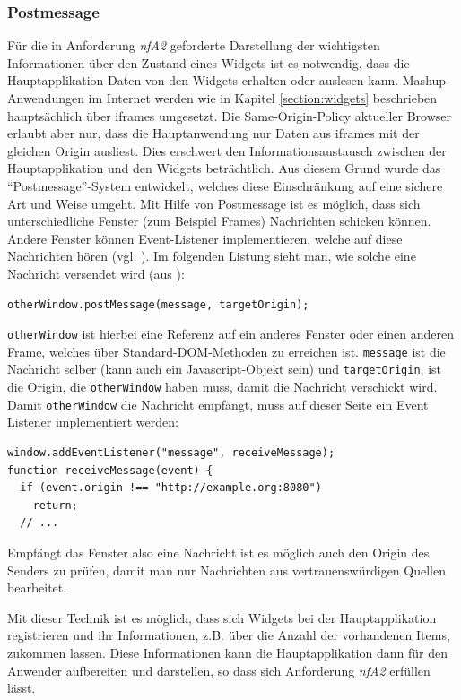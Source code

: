 \subsubsection*{Postmessage}
Für die in Anforderung \emph{nfA2} geforderte Darstellung der wichtigsten Informationen über den Zustand eines Widgets ist es notwendig, dass die Hauptapplikation Daten von den Widgets erhalten oder auslesen kann. Mashup-Anwendungen im Internet werden wie in Kapitel \ref{section:widgets} beschrieben hauptsächlich über iframes umgesetzt. Die Same-Origin-Policy aktueller Browser erlaubt aber nur, dass die Hauptanwendung nur Daten aus iframes mit der gleichen Origin ausliest. Dies erschwert den Informationsaustausch zwischen der Hauptapplikation und den Widgets beträchtlich. Aus diesem Grund wurde das "`Postmessage"'-System entwickelt, welches diese Einschränkung auf eine sichere Art und Weise umgeht. Mit Hilfe von Postmessage ist es möglich, dass sich unterschiedliche Fenster (zum Beispiel Frames) Nachrichten schicken können. Andere Fenster können Event-Listener implementieren, welche auf diese Nachrichten hören (vgl. \cite{MDN2012}). Im folgenden Listung sieht man, wie solche eine Nachricht versendet wird (aus \cite{MDN2012}):
\begin{lstlisting}
otherWindow.postMessage(message, targetOrigin);
\end{lstlisting}
\texttt{otherWindow} ist hierbei eine Referenz auf ein anderes Fenster oder einen anderen Frame, welches über Standard-DOM-Methoden zu erreichen ist. \texttt{message} ist die Nachricht selber (kann auch ein Javascript-Objekt sein) und \texttt{targetOrigin}, ist die Origin, die \texttt{otherWindow} haben muss, damit die Nachricht verschickt wird. Damit \texttt{otherWindow} die Nachricht empfängt, muss auf dieser Seite ein Event Listener implementiert werden:
\begin{lstlisting}
window.addEventListener("message", receiveMessage);
function receiveMessage(event) {
  if (event.origin !== "http://example.org:8080")
    return;
  // ...
\end{lstlisting}
Empfängt das Fenster also eine Nachricht ist es möglich auch den Origin des Senders zu prüfen, damit man nur Nachrichten aus vertrauenswürdigen Quellen bearbeitet.

Mit dieser Technik ist es möglich, dass sich Widgets bei der Hauptapplikation registrieren und ihr Informationen, z.B. über die Anzahl der vorhandenen Items, zukommen lassen. Diese Informationen kann die Hauptapplikation dann für den Anwender aufbereiten und darstellen, so dass sich Anforderung \emph{nfA2} erfüllen lässt.

